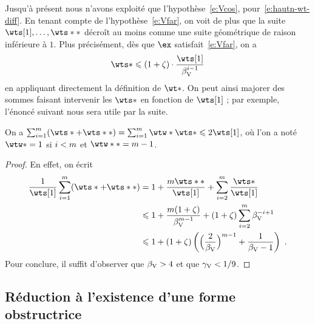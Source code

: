 Jusqu'à présent nous n'avons exploité que l'hypothèse~\eqref{e:Vcos},
pour~\eqref{e:hautn-wt-diff}. En tenant compte de l'hypothèse~\eqref{e:Vfar}, on
voit de plus que la suite \( \wts[1], \dots, \wts** \) décroît
au moins comme une suite géométrique de raison inférieure à $1$. Plus
précisément, dès que \( \ex \) satisfait~\eqref{e:Vfar}, on a
\begin{equation} \label{e:wt-geom}
  \wts*
  \le
  (1+\zeta) \cdot \frac{\wts[1]}{\Vfar^{\fct-1}}
\end{equation}
en appliquant directement la définition de \( \wt* \). On peut ainsi majorer
des sommes faisant intervenir les \( \wts* \) en fonction de \( \wts[1] \) ;
par exemple, l'énoncé suivant nous sera utile par la suite.

\begin{lem} \label{l:sum-wts}
  On a \(
    \sum\fctrange (\wts* + \wts**)
    = \sum\fctrange \wtw* \wts*
    \le 2 \wts[1]
  \), où l'on a noté \( \wtw* = 1 \) si \( i < m \) et \( \wtw** =
    \puiss - 1 \).
\end{lem}

\begin{proof}
  En effet, on écrit
  \begin{align}
    \frac1{\wts[1]} \sum_{\fct=1}^\puiss (\wts* + \wts**)
    & = 1
    + \frac{\puiss \wts**}{\wts[1]}
    + \sum_{\fct=2}^\puiss \frac{\wts*}{\wts[1]}
    \\
    & \le 1
    + \frac{\puiss(1+\zeta)}{\Vfar^{\puiss-1}}
    + (1+\zeta) \sum_{\fct=2}^\puiss \Vfar^{-\fct+1}
    \\
    & \le 1 + (1+\zeta) \left(
      \Bigl( \frac2\Vfar \Bigr)^{\puiss-1}
      + \frac1{\Vfar-1}
    \right)
    \pmm.
  \end{align}
  Pour conclure, il suffit d'observer que \( \beta \sb{\mathrm{V}} > 4 \) et que \( \gamma \sb{\mathrm{V}} <
    1/9 \).
\end{proof}


\subsection{Réduction à l'existence d'une forme obstructrice}
\label{sec:vojta-prop}


